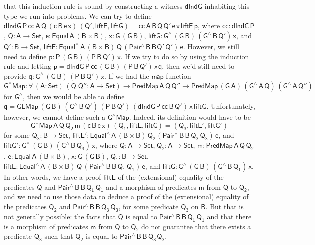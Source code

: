 \documentclass[9pt]{entcs}
\begin{document}
that this induction rule is sound by constructing a witness
$\mathsf{dIndG}$ inhabiting this type we run into problems. We can try
to define $\mathsf{dIndG\,P\,cc\,A\,Q\,(c\,B\,e\,x)\,(Q', liftE,
  liftG) = cc\,A\,B\,Q\,Q'\,e\,x\,liftE\,p}$, where $\mathsf{cc :
  dIndC\,P}$, $\mathsf{Q : A \to Set}$, $\mathsf{e : Equal\,A\,(B
  \times B)}$, $\mathsf{x : G\,(G\,B)}$, $\mathsf{liftG :
  G^{\wedge}\,(G\,B)\,(G^{\wedge}\,B\,Q')\,x}$, and $\mathsf{Q' : B
  \to Set}$, $\mathsf{liftE : Equal^{\wedge}\,A\,(B \times
  B)\,Q\,(Pair^{\wedge}\,B\,B\,Q'\,Q')\,e}$.  However, we still need
to define $\mathsf{p : P\,(G\,B)\,(P\,B\,Q')\,x}$.  If we try to do so
by using the induction rule and letting $\mathsf{p =
  dIndG\,P\,cc\,(G\,B)\,(P\,B\,Q')\,x\,q}$, then we'd still need to
provide $\mathsf{q : G^{\wedge}\,(G\,B)\,(P\,B\,Q')\,x}$.  If we had
the $\mathsf{map}$ function $\mathsf{G^\wedge Map : \forall\, (A :
  Set)\, (Q\;Q'' : A \to Set) \to PredMap\,A\,Q\,Q'' \to
  PredMap\,(G\,A)\,(G^{\wedge}\,A\,Q)\,(G^{\wedge}\,A\,Q'')}$ for
$\mathsf{G^{\wedge}}$, then we would be able to define $\mathsf{q =
  GLMap\,(G\,B)\,(G^{\wedge}\,B\,Q')\,(P\,B\,Q')\,
  (dIndG\,P\,cc\,B\,Q')\,x\,liftG}$.
Unfortunately, however, we cannot define such a $\mathsf{G^\wedge Map}$.
Indeed, its definition would have to be
\[
\mathsf{G^\wedge Map\,A\,Q\,Q_2\,m\,(c\,B\,e\,x)\,(Q_1, liftE, liftG) =
  (Q_3, liftE', liftG')}
\]
for some $\mathsf{Q_3 : B \to Set}$, $\mathsf{liftE' :
  Equal^{\wedge}\,A\,(B \times
  B)\,Q_2\,(Pair^{\wedge}\,B\,B\,Q_3\,Q_3)\,e}$, and $\mathsf{liftG' :
  G^{\wedge}\,(G\,B)\,(G^{\wedge}\,B\,Q_3)\,x}$, where $\mathsf{Q : A
  \to Set}$, $\mathsf{Q_2 : A \to Set}$, $\mathsf{m :
  PredMap\,A\,Q\,Q_2}$, $\mathsf{e : Equal\,A\,(B \times B)}$,
$\mathsf{x : G\,(G\,B)}$, $\mathsf{Q_1 : B \to Set}$, $\mathsf{liftE :
  Equal^{\wedge}\,A\,(B \times
  B)\,Q\,(Pair^{\wedge}\,B\,B\,Q_1\,Q_1)\,e}$, and $\mathsf{liftG :
  G^{\wedge}\,(G\,B)\,(G^{\wedge}\,B\,Q_1)\,x}$. In other words, we
have a proof $\mathsf{liftE}$ of the (extensional) equality of the
predicates $\mathsf{Q}$ and $\mathsf{Pair^{\wedge}\,B\,B\,Q_1\,Q_1}$
and a morphism of predicates $\mathsf{m}$ from $\mathsf{Q}$ to
$\mathsf{Q_2}$, and we need to use those data to deduce a proof of the
(extensional) equality of the predicates $\mathsf{Q_2}$ and
$\mathsf{Pair^{\wedge}\,B\,B\,Q_3\,Q_3}$, for some predicate
$\mathsf{Q_3}$ on $\mathsf{B}$.  But that is not generally possible:
the facts that $\mathsf{Q}$ is equal to
$\mathsf{Pair^{\wedge}\,B\,B\,Q_1\,Q_1}$ and that there is a morphism
of predicates $\mathsf{m}$ from $\mathsf{Q}$ to $\mathsf{Q_2}$ do not
guarantee that there exists a predicate $\mathsf{Q_3}$ such that
$\mathsf{Q_2}$ is equal to $\mathsf{Pair^{\wedge}\,B\,B\,Q_3\,Q_3}$.
\end{document}
